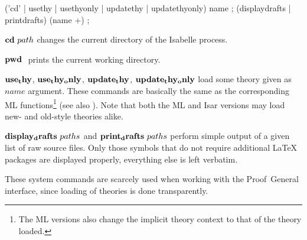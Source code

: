 
\begin{rail}
  ('cd' | usethy | usethyonly | updatethy | updatethyonly) name
  ;
  (displaydrafts | printdrafts) (name +)
  ;
\end{rail}

\begin{descr}
\item [${\mathord{\mathbf{cd}}}~path$] changes the current directory of the Isabelle
  process.
\item [${\mathord{\mathbf{pwd}}}~$] prints the current working directory.
\item [${\mathord{\mathbf{use_thy}}}$, ${\mathord{\mathbf{use_thy_only}}}$,
  ${\mathord{\mathbf{update_thy}}}$, ${\mathord{\mathbf{update_thy_only}}}$] load some
  theory given as $name$ argument.  These commands are basically the same as
  the corresponding ML functions\footnote{The ML versions also change the
    implicit theory context to that of the theory loaded.}  (see also
  \cite[\S1,\S6]{isabelle-ref}).  Note that both the ML and Isar versions may
  load new- and old-style theories alike.
\item [${\mathord{\mathbf{display_drafts}}}~paths$ and
  ${\mathord{\mathbf{print_drafts}}}~paths$] perform simple output of a given list of
  raw source files.  Only those symbols that do not require additional
  {\LaTeX} packages are displayed properly, everything else is left verbatim.
\end{descr}

These system commands are scarcely used when working with the Proof~General
interface, since loading of theories is done transparently.

